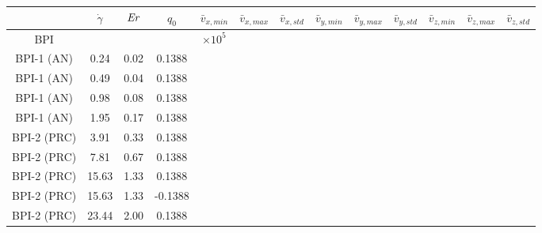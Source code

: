\documentclass[8.5pt,twoside,twocolumn]{article}
\begin{document}
{\begin{table}[htpb]
\begin{tabular}{|c||c|| c || c || c |c |c||c| c| c||c| c| c|}
\hline
& $\dot{\gamma}$ & ${\it Er}$ & $q_0$ & $\bar{v}_{x,min}$ & $\bar{v}_{x,max}$ & $\bar{v}_{x,std}$ & $\bar{v}_{y,min}$ & $\bar{v}_{y,max}$ & $\bar{v}_{y,std}$ & $\bar{v}_{z,min}$ & $\bar{v}_{z,max}$ & $\bar{v}_{z,std}$ \\
\hline
BPI & & & & $\times 10^5$\\
\hline
BPI-1 (AN) &0.24 &0.02 & 0.1388 & & & & & & & & & \\
BPI-1 (AN) &0.49 &0.04 & 0.1388 & & & & & & & & & \\
BPI-1 (AN) &0.98 &0.08 & 0.1388 & & & & & & & & & \\
BPI-1 (AN) &1.95 &0.17 & 0.1388 & & & & & & & & & \\
\hline
BPI-2 (PRC) &3.91 &0.33 & 0.1388 & & & & & & & & & \\
BPI-2 (PRC) &7.81 &0.67 & 0.1388 & & & & & & & & & \\
BPI-2 (PRC) &15.63 &1.33 & 0.1388 & & & & & & & & & \\
BPI-2 (PRC) &15.63 &1.33 & -0.1388 & & & & & & & & & \\
BPI-2 (PRC) &23.44 &2.00 & 0.1388 & & & & & & & & & \\

\end{tabular}
\end{table}}
\end{document}
